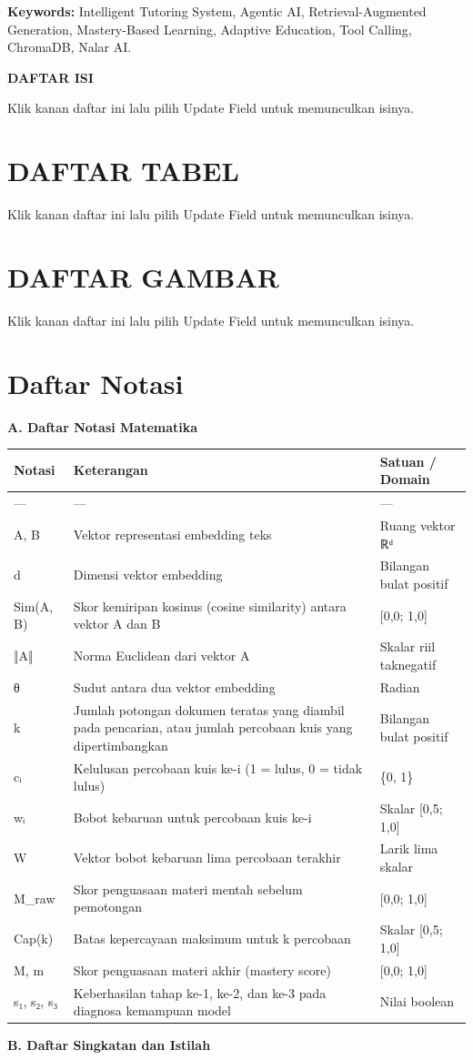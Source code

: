 \documentclass[12pt,a4paper]{article}
\begin{document}
\textbf{Keywords:} Intelligent Tutoring System, Agentic AI, Retrieval-Augmented Generation, Mastery-Based Learning, Adaptive Education, Tool Calling, ChromaDB, Nalar AI.

\newpage
\textbf{DAFTAR ISI}

Klik kanan daftar ini lalu pilih Update Field untuk memunculkan isinya.

\newpage
\section*{DAFTAR TABEL}
Klik kanan daftar ini lalu pilih Update Field untuk memunculkan isinya.

\newpage
\section*{DAFTAR GAMBAR}
Klik kanan daftar ini lalu pilih Update Field untuk memunculkan isinya.

\newpage
\section*{Daftar Notasi}
\textbf{A. Daftar Notasi Matematika}

\begin{table}[h]
\centering
\begin{tabular}{lll}
\toprule
Notasi & Keterangan & Satuan / Domain \\
\midrule
--- & --- & --- \\
A, B & Vektor representasi embedding teks & Ruang vektor ℝᵈ \\
d & Dimensi vektor embedding & Bilangan bulat positif \\
Sim(A, B) & Skor kemiripan kosinus (cosine similarity) antara vektor A dan B & {[}0,0; 1,0{]} \\
‖A‖ & Norma Euclidean dari vektor A & Skalar riil taknegatif \\
θ & Sudut antara dua vektor embedding & Radian \\
k & Jumlah potongan dokumen teratas yang diambil pada pencarian, atau jumlah percobaan kuis yang dipertimbangkan & Bilangan bulat positif \\
cᵢ & Kelulusan percobaan kuis ke-i (1 = lulus, 0 = tidak lulus) & \{0, 1\} \\
wᵢ & Bobot kebaruan untuk percobaan kuis ke-i & Skalar {[}0,5; 1,0{]} \\
W & Vektor bobot kebaruan lima percobaan terakhir & Larik lima skalar \\
M\_raw & Skor penguasaan materi mentah sebelum pemotongan & {[}0,0; 1,0{]} \\
Cap(k) & Batas kepercayaan maksimum untuk k percobaan & Skalar {[}0,5; 1,0{]} \\
M, m & Skor penguasaan materi akhir (mastery score) & {[}0,0; 1,0{]} \\
s₁, s₂, s₃ & Keberhasilan tahap ke-1, ke-2, dan ke-3 pada diagnosa kemampuan model & Nilai boolean \\
\bottomrule
\end{tabular}
\end{table}
\textbf{B. Daftar Singkatan dan Istilah}
\end{document}
